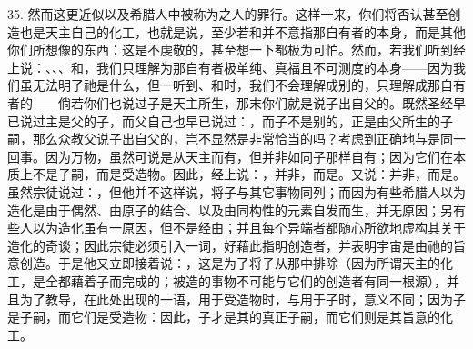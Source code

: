 35. 然而这更近似以及希腊人中被称为之人的罪行。这样一来，你们将否认甚至创造也是天主自己的化工，也就是说，至少若和并不意指那自有者的本身，而是其他你们所想像的东西：这是不虔敬的，甚至想一下都极为可怕。然而，若我们听到经上说：、、、和，我们只理解为那自有者极单纯、真福且不可测度的本身——因为我们虽无法明了祂是什么，但一听到、和时，我们不会理解成别的，只理解成那自有者的——倘若你们也说过子是天主所生，那末你们就是说子出自父的。既然圣经早已说过主是父的子，而父自己也早已说过：，而子不是别的，正是由父所生的子嗣，那么众教父说子出自父的，岂不显然是非常恰当的吗？考虑到正确地与是同一回事。因为万物，虽然可说是从天主而有，但并非如同子那样自有；因为它们在本质上不是子嗣，而是受造物。因此，经上说：，并非，而是。又说：并非，而是。虽然宗徒说过：，但他并不这样说，将子与其它事物同列；而因为有些希腊人以为造化是由于偶然、由原子的结合、以及由同构性的元素自发而生，并无原因；另有些人以为造化虽有一原因，但不是经由；并且每个异端者都随心所欲地虚构其关于造化的奇谈；因此宗徒必须引入一词，好藉此指明创造者，并表明宇宙是由祂的旨意创造。于是他又立即接着说：，这是为了将子从那中排除（因为所谓天主的化工，是全都藉着子而完成的；被造的事物不可能与它们的创造者有同一根源），并且为了教导，在此处出现的一语，用于受造物时，与用于子时，意义不同；因为子是子嗣，而它们是受造物：因此，子才是其的真正子嗣，而它们则是其旨意的化工。\par

